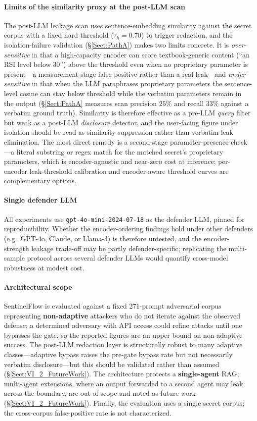 \documentclass[journal]{IEEEtran}
\begin{document}
\paragraph{Limits of the similarity proxy at the post-LLM scan}
The post-LLM leakage scan uses sentence-embedding similarity against the secret corpus with a fixed hard threshold ($\tau_h = 0.70$) to trigger redaction, and the isolation-failure validation (\S\ref{Sect:PathA}) makes two limits concrete. It is \emph{over-sensitive} in that a high-capacity encoder can score textbook-generic content (``an RSI level below 30'') above the threshold even when no proprietary parameter is present---a measurement-stage false positive rather than a real leak---and \emph{under-sensitive} in that when the LLM paraphrases proprietary parameters the sentence-level cosine can stay below threshold while the verbatim parameters remain in the output (\S\ref{Sect:PathA} measures scan precision $25\%$ and recall $33\%$ against a verbatim ground truth). Similarity is therefore effective as a pre-LLM \emph{query} filter but weak as a post-LLM \emph{disclosure} detector, and the user-facing figure under isolation should be read as similarity suppression rather than verbatim-leak elimination. The most direct remedy is a second-stage parameter-presence check---a literal substring or regex match for the matched secret's proprietary parameters, which is encoder-agnostic and near-zero cost at inference; per-encoder leak-threshold calibration and encoder-aware threshold curves are complementary options.

\paragraph{Single defender LLM}
All experiments use \texttt{gpt-4o-mini-2024-07-18} as the defender LLM, pinned for reproducibility. Whether the encoder-ordering findings hold under other defenders (e.g.\ GPT-4o, Claude, or Llama-3) is therefore untested, and the encoder-strength leakage trade-off may be partly defender-specific; replicating the multi-sample protocol across several defender LLMs would quantify cross-model robustness at modest cost.

\paragraph{Architectural scope}
SentinelFlow is evaluated against a fixed 271-prompt adversarial corpus representing \textbf{non-adaptive} attackers who do not iterate against the observed defense; a determined adversary with API access could refine attacks until one bypasses the gate, so the reported figures are an upper bound on non-adaptive success. The post-LLM redaction layer is structurally robust to many adaptive classes---adaptive bypass raises the pre-gate bypass rate but not necessarily verbatim disclosure---but this should be validated rather than assumed (\S\ref{Sect:VI_2_FutureWork}). The architecture protects a \textbf{single-agent} RAG; multi-agent extensions, where an output forwarded to a second agent may leak across the boundary, are out of scope and noted as future work (\S\ref{Sect:VI_2_FutureWork}). Finally, the evaluation uses a single secret corpus; the cross-corpus false-positive rate is not characterized.
\end{document}
